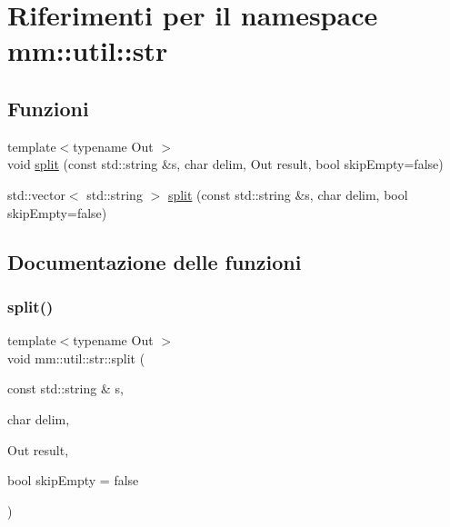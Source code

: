 \hypertarget{namespacemm_1_1util_1_1str}{}\section{Riferimenti per il namespace mm\+:\+:util\+:\+:str}
\label{namespacemm_1_1util_1_1str}
\subsection*{Funzioni}
\begin{DoxyCompactItemize}
\item 
{\footnotesize template$<$typename Out $>$ }\\void \hyperlink{namespacemm_1_1util_1_1str_a0d736c6931c50f009683998b5b4cdcaa}{split} (const std\+::string \&s, char delim, Out result, bool skip\+Empty=false)
\item 
std\+::vector$<$ std\+::string $>$ \hyperlink{namespacemm_1_1util_1_1str_a8e83f696879551bdc931a85f037a4671}{split} (const std\+::string \&s, char delim, bool skip\+Empty=false)
\end{DoxyCompactItemize}


\subsection{Documentazione delle funzioni}
\mbox{\label{namespacemm_1_1util_1_1str_a0d736c6931c50f009683998b5b4cdcaa}} 
\subsubsection{\texorpdfstring{split()}{split()}\hspace{0.1cm}{\footnotesize\ttfamily [1/2]}}
{\footnotesize\ttfamily template$<$typename Out $>$ \\
void mm\+::util\+::str\+::split (\begin{DoxyParamCaption}\item[{const std\+::string \&}]{s,  }\item[{char}]{delim,  }\item[{Out}]{result,  }\item[{bool}]{skip\+Empty = {\ttfamily false} }\end{DoxyParamCaption})}

\mbox{\label{namespacemm_1_1util_1_1str_a8e83f696879551bdc931a85f037a4671}} 
